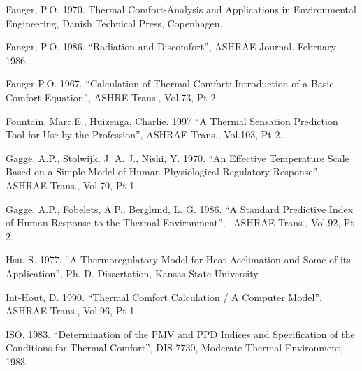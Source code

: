 Fanger, P.O. 1970. Thermal Comfort-Analysis and Applications in Environmental Engineering, Danish Technical Press, Copenhagen.

Fanger, P.O. 1986. ``Radiation and Discomfort'', ASHRAE Journal. February 1986.

Fanger P.O. 1967. ``Calculation of Thermal Comfort: Introduction of a Basic Comfort Equation'', ASHRE Trans., Vol.73, Pt 2.

Fountain, Marc.E., Huizenga, Charlie. 1997 ``A Thermal Sensation Prediction Tool for Use by the Profession'', ASHRAE Trans., Vol.103, Pt 2.

Gagge, A.P., Stolwijk, J. A. J., Nishi, Y. 1970. ``An Effective Temperature Scale Based on a Simple Model of Human Physiological Regulatory Response'', ASHRAE Trans., Vol.70, Pt 1.

Gagge, A.P., Fobelets, A.P., Berglund, L. G. 1986. ``A Standard Predictive Index of Human Response to the Thermal Environment'',~ ASHRAE Trans., Vol.92, Pt 2.

Hsu, S. 1977. ``A Thermoregulatory Model for Heat Acclimation and Some of its Application'', Ph. D. Dissertation, Kansas State University.

Int-Hout, D. 1990. ``Thermal Comfort Calculation / A Computer Model'', ASHRAE Trans., Vol.96, Pt 1.

ISO. 1983. ``Determination of the PMV and PPD Indices and Specification of the Conditions for Thermal Comfort'', DIS 7730, Moderate Thermal Environment, 1983.
